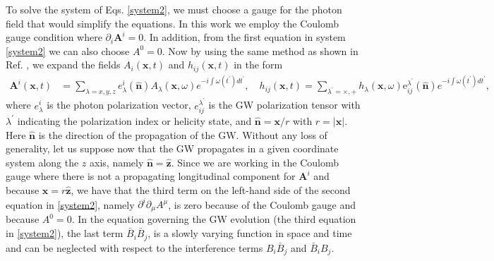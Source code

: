\documentclass[a4paper,11pt]{article}
\newcommand{\bs}{\boldsymbol}
\begin{document}
To solve the system of Eqs. \eqref{system2}, we must choose a gauge for the photon field that would simplify the equations. In this work we employ the Coulomb gauge condition where $\partial_i\bs A^i=0$. In addition, from the first equation in system \eqref{system2} we can also choose $A^0=0$. Now by using the same method as shown in Ref. \cite{Ejlli:2016asd}, we expand the fields $A_i(\bs x, t)$ and $h_{ij}(\bs x, t)$ in the form
\begin{align}\label{field-expansion}
\bs A^i({\bs x}, t) &=\sum_{\lambda=x, y, z} e_\lambda^{i}(\hat{\bs n}) A_{\lambda}({\bs x, \omega})e^{-i \int \omega(t^\prime) dt^\prime},\quad  h_{ij}(\bs x, t)=\sum_{\lambda^\prime=\times, +} h_\lambda(\bs x, \omega) \textrm{e}_{ij}^{\lambda^\prime}(\hat{\bs n}) e^{-i \int \omega(t^\prime) dt^\prime},%
\end{align}
where $e_\lambda^i$ is the photon polarization vector, $e_{ij}^{\lambda^\prime}$ is the GW polarization tensor with $\lambda^\prime$ indicating the polarization index or helicity state, and $\hat{\bs n}=\bs x/r$ with $r=|\bs x|$. Here $\hat{\bs n}$ is the direction of the propagation of the GW. Without any loss of generality, let us suppose now that the GW propagates in a given coordinate system along the $z$ axis, namely $\hat{\bs n}=\hat{\bs z}$. Since we are working in the Coulomb gauge where there is not a propagating longitudinal component for $\bs A^i$ and because $\bs x=r \hat{\bs z}$, we have that the third term on the left-hand side of the second equation in \eqref{system2}, namely $\partial^i\partial_\mu A^\mu$, is zero because of the Coulomb gauge and because $A^0=0$. In the equation governing the GW evolution (the third equation in \eqref{system2}), the last term $\bar B_i \bar B_j$, is a slowly varying function in space and time and can be neglected with respect to the interference terms $B_i \bar B_j$ and $\bar B_i B_j$.
\end{document}
